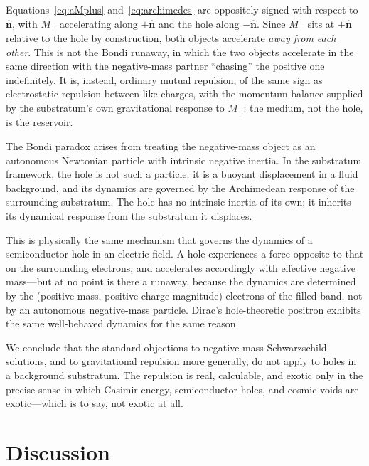\documentclass[%
  reprint,
  superscriptaddress,
  showpacs,
  showkeys,
  amsmath,amssymb,
  pra,
  longbibliography,
  floatfix,
  x11names
]{revtex4-2}
\begin{document}
Equations~\eqref{eq:aMplus} and~\eqref{eq:archimedes} are oppositely signed with respect to $\hat{\mathbf{n}}$, with $M_+$ accelerating along $+\hat{\mathbf{n}}$ and the hole along $-\hat{\mathbf{n}}$. Since $M_+$ sits at $+\hat{\mathbf{n}}$ relative to the hole by construction, both objects accelerate \emph{away from each other}. This is not the Bondi runaway, in which the two objects accelerate in the same direction with the negative-mass partner ``chasing'' the positive one indefinitely. It is, instead, ordinary mutual repulsion, of the same sign as electrostatic repulsion between like charges, with the momentum balance supplied by the substratum's own gravitational response to $M_+$: the medium, not the hole, is the reservoir.

The Bondi paradox arises from treating the negative-mass object as an autonomous Newtonian particle with intrinsic negative inertia. In the substratum framework, the hole is not such a particle: it is a buoyant displacement in a fluid background, and its dynamics are governed by the Archimedean response of the surrounding substratum. The hole has no intrinsic inertia of its own; it inherits its dynamical response from the substratum it displaces.

This is physically the same mechanism that governs the dynamics of a semiconductor hole in an electric field. A hole experiences a force opposite to that on the surrounding electrons, and accelerates accordingly with effective negative mass---but at no point is there a runaway, because the dynamics are determined by the (positive-mass, positive-charge-magnitude) electrons of the filled band, not by an autonomous negative-mass particle. Dirac's hole-theoretic positron exhibits the same well-behaved dynamics for the same reason.

We conclude that the standard objections to negative-mass Schwarzschild solutions, and to gravitational repulsion more generally, do not apply to holes in a background substratum. The repulsion is real, calculable, and exotic only in the precise sense in which Casimir energy, semiconductor holes, and cosmic voids are exotic---which is to say, not exotic at all.

\section{Discussion}
\label{sec:discuss}
\end{document}
